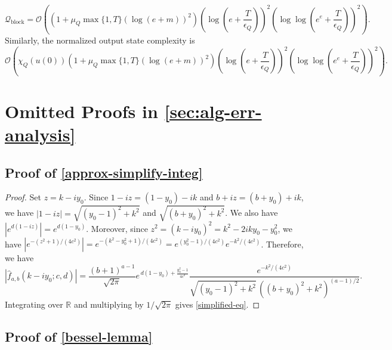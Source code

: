 \documentclass[10pt,reqno]{article}
\numberwithin{equation}{section}
\theoremstyle{plain}
\theoremstyle{definition}
\begin{document}
\begin{equation}\label{eq:tfim-optimized-block-complexity}
\mathcal Q_{\operatorname{block}}=\mathcal O\left(\left(1+\mu_Q\max\{1,T\}(\log(e+m))^2\right)\left(\log\left(e+\frac{T}{\epsilon_Q}\right)\right)^2\left(\log\log\left(e^e+\frac{T}{\epsilon_Q}\right)\right)^2\right).
\end{equation}
Similarly, the normalized output state complexity is
\begin{equation}\label{eq:tfim-optimized-state-complexity}
\mathcal O\left(\chi_Q(u(0))\left(1+\mu_Q\max\{1,T\}(\log(e+m))^2\right)\left(\log\left(e+\frac{T}{\epsilon_Q}\right)\right)^2\left(\log\log\left(e^e+\frac{T}{\epsilon_Q}\right)\right)^2\right).
\end{equation}


\printbibliography
\appendix 
{}
\section{Omitted Proofs in \cref{sec:alg-err-analysis}}\label{app-alg-err}

\subsection{Proof of \cref{approx-simplify-integ}}\label{proof-of-approx-simplify-integ}

\begin{proof}
Set \(z = k-i y_0\). Since \(1-iz = (1-y_0)-ik\) and \(b+iz = (b+y_0)+ik\), we have $|1-iz| = \sqrt{(y_0-1)^2+k^2}$ and $\sqrt{(b+y_0)^2+k^2}$. We also have \(|e^{d(1-iz)}| = e^{d(1-y_0)}\). Moreover, since \(z^2 = (k-i y_0)^2 = k^2-2iky_0-y_0^2\), we have $|e^{-(z^2+1)/(4c^2)}| = e^{-(k^2-y_0^2+1)/(4c^2)} = e^{(y_0^2-1)/(4c^2)}e^{-k^2/(4c^2)}$. 
Therefore, we have
\begin{equation}
|\hat f_{a,b}(k-i y_0;c,d)| = \frac{(b+1)^{a-1}}{\sqrt{2\pi}}e^{\,d(1-y_0)+\frac{y_0^2-1}{4c^2}}\frac{e^{-k^2/(4c^2)}}{\sqrt{(y_0-1)^2+k^2}\,((b+y_0)^2+k^2)^{(a-1)/2}}.
\end{equation}
Integrating over \(\mathbb{R}\) and multiplying by \(1/\sqrt{2 \pi}\) gives \cref{simplified-eq}.
\end{proof}

\subsection{Proof of \cref{bessel-lemma}}\label{proof-of-bessel-lemma}
\end{document}
